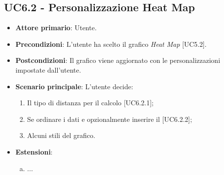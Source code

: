 \subsection{UC6.2 - Personalizzazione Heat Map}
\begin{itemize}
	\item \textbf{Attore primario}: Utente.
	
	\item \textbf{Precondizioni}: L'utente ha scelto il grafico \textit{Heat Map} [UC5.2].
	
	\item \textbf{Postcondizioni}: Il grafico viene aggiornato con le personalizzazioni impostate dall'utente.
	
	\item \textbf{Scenario principale}: L'utente decide:
	
\begin{enumerate}
\item Il tipo di distanza per il calcolo [UC6.2.1];
\item Se ordinare i dati e opzionalmente inserire il  [UC6.2.2];
\item Alcuni stili del grafico.
\end{enumerate}	
		
		\item \textbf{Estensioni}:
	\begin{enumerate}[(a)]
		\item ...
	\end{enumerate}
\end{itemize}
